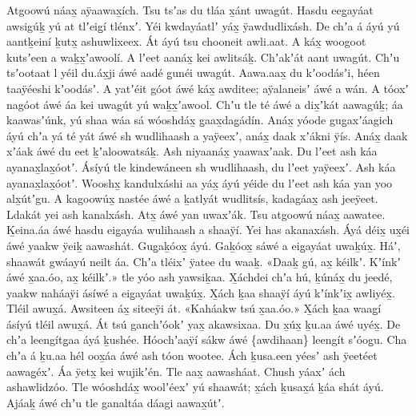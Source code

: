 \begin{pairs}
\begin{Leftside}
Atgoowú náax̱ aÿaawax̱ích.
Tsu tsʼas du tláa x̱ánt uwagút.
Hasdu eeg̱ayáat awsigúḵ yú at tlʼeig̱í tlénxʼ.
Yéi kwdayáatlʼ yáx̱ ÿawdudlixásh.
De chʼa á áyú yú aantḵeiní ḵutx̱ ashuwlixeex.
\pend
\pstart
{}Át áyú tsu chooneit awli.aat.
A káx̱ woogoot kutsʼeen a waḵx̱ʼawoolí.
A lʼeet aanáx̱ kei awlitsáḵ.
Chʼakʼát aant uwagút.
Chʼu tsʼootaat l yéil du.áx̱ji áwé aadé g̱unéi uwagút.
Aawa.aax̱ du kʼoodásʼi, héen taa\-ÿéeshi kʼoodásʼ.
A yatʼéit góot áwé káx̱ awditee;
aÿalaneisʼ áwé a wán.
A tóoxʼ nagóot áwé áa kei uwagút yú waḵx̱ʼawool.
Chʼu tle té áwé a dix̱ʼkát aawagúḵ;
áa kaawasʼúnk, yú shaa wáa sá wóoshdáx̱ g̱aax̱\-dag̱ádín.
Anáx̱ yóode gug̱axʼáagich áyú chʼa yá té yát áwé sh wudlihaash a yaÿeexʼ, anáx̱ daak xʼákni ÿís.
Anáx̱ daak xʼáak áwé du eet ḵʼaloowatsáḵ.
Ash niyaanáx̱ yaa\-wa\-xʼaak.
Du lʼeet ash káa ayanax̱lax̱óotʼ.
Á\-sí\-yú tle kindewáneen sh wudlihaash, du lʼeet yaÿeexʼ.
Ash káa ayanax̱lax̱óotʼ.
Wooshx̱ kandulxáshi aa yáx̱ áyú yéide du lʼeet ash káa yan yoo alx̱útʼgu.
A kagoowúx̱ nastée áwé a ḵatlyát wudlitsís, kadagáax̱ ash jeeÿeet.
Ldakát yei ash kanalxásh.
Atx̱ áwé yan u\-waxʼák.
Tsu atgoowú náax̱ aawatee.
Ḵei\-na.áa áwé hasdu eig̱ayáa wulihaash a shaaÿí.
Yei has akanaxásh.
\pend
\pstart
{}Áyá déix̱ ux̱éi áwé yaakw ÿeiḵ aawashát.
Gug̱aḵóox̱ áyú.
Gaḵóox̱ sáwé a eig̱ayáat uwaḵúx̱.
Háʼ, shaawát gwáayú neilt áa.
Chʼa tléixʼ ÿatee du waaḵ.
«\!Daaḵ gú, ax̱ kéilkʼ.
Kʼínkʼ áwé x̱aa.óo, ax̱ kéilkʼ.\!»
tle yóo ash yawsiḵaa.
X̱áchdei chʼa hú, ḵúnáx̱ du jeedé, yaakw naháaÿi ásíwé a eig̱ayáat uwaḵúx̱.
X̱ách ḵaa shaaÿí áyú kʼínkʼix̱ awli\-yéx̱.
Tléil awux̱á.
Awsiteen áx̱ siteeÿi át.
«\!Kaháakw tsú x̱aa.óo.\!»
X̱ách ḵaa waag̱í ásíyú tléil awux̱á.
Át tsú ganchʼóokʼ yax̱ akawsixaa.
Du x̱úx̱ ḵu.aa áwé uyéx̱.
De chʼa leengítg̱aa áyá ḵushée.
Hóochʼaaÿí sákw áwé \{awdihaan\} leengít sʼóog̱u.
Cha chʼa á ḵu.aa hél oox̱áa áwé ash tóon wootee.
Ách ḵusa.een yéesʼ ash ÿeetéet aawag̱éxʼ.
Áa ÿetx̱ kei wujikʼén.
Tle aax̱ aawasháat.
Chush yáaxʼ ách ashawlidzóo.
Tle wóosh\-dáx̱ woolʼéexʼ yú shaawát;
x̱ách ḵusax̱á ḵáa shát áyú.
Ajáaḵ áwé chʼu tle ganaltáa dáagi aawax̱útʼ.

\end{Leftside}
\end{pairs}
